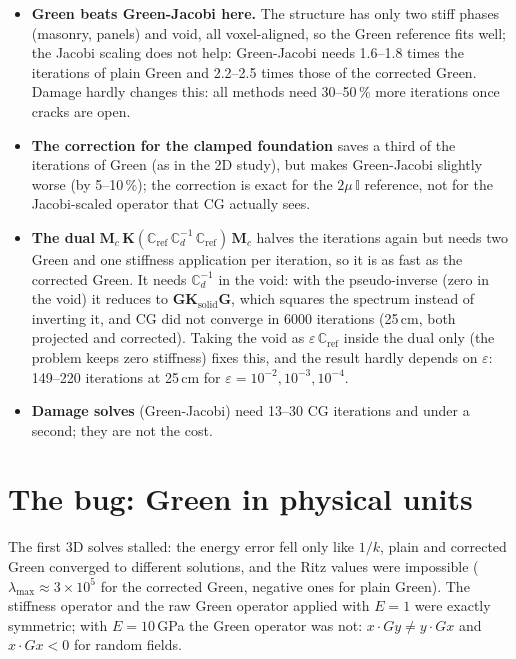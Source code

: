 \documentclass[11pt,a4paper]{article}
\begin{document}
\begin{itemize}
  \item \textbf{Green beats Green-Jacobi here.} The structure has only two stiff phases (masonry, panels) and void,
        all voxel-aligned, so the Green reference fits well; the Jacobi scaling does not help: Green-Jacobi needs 1.6--1.8 times the
        iterations of plain Green and 2.2--2.5 times those of the corrected Green. Damage hardly changes this: all methods need 30--50\,\% more iterations once cracks are open.
  \item \textbf{The correction for the clamped foundation} saves a third of the iterations of Green (as in the 2D
        study), but makes Green-Jacobi slightly worse (by 5--10\,\%); the correction is exact for the
        $2\mu\,\mathbb{I}$ reference, not for the Jacobi-scaled operator that CG actually sees.
  \item \textbf{The dual} $\mathbf{M}_c\,\mathbf{K}(\mathbb{C}_{\mathrm{ref}}\,\mathbb{C}_d^{-1}\,
        \mathbb{C}_{\mathrm{ref}})\,\mathbf{M}_c$ halves the iterations again but needs two Green and one stiffness
        application per iteration, so it is as fast as the corrected Green. It needs $\mathbb{C}_d^{-1}$ in the void:
        with the pseudo-inverse (zero in the void) it reduces to $\mathbf{G}\mathbf{K}_{\mathrm{solid}}\mathbf{G}$,
        which squares the spectrum instead of inverting it, and CG did not converge in 6000 iterations (25\,cm, both
        projected and corrected). Taking the void as $\varepsilon\,\mathbb{C}_{\mathrm{ref}}$ inside the dual only (the
        problem keeps zero stiffness) fixes this, and the result hardly depends on $\varepsilon$: 149--220 iterations at
        25\,cm for $\varepsilon = 10^{-2}, 10^{-3}, 10^{-4}$.
  \item \textbf{Damage solves} (Green-Jacobi) need 13--30 CG iterations and under a second; they are not the cost.
\end{itemize}

\section{The bug: Green in physical units}
\label{sec:bug}

The first 3D solves stalled: the energy error fell only like $1/k$, plain and corrected Green converged to different
solutions, and the Ritz values were impossible ($\lambda_{\max} \approx 3\times10^5$ for the corrected Green, negative
ones for plain Green). The stiffness operator and the raw Green operator applied with $E = 1$ were exactly symmetric;
with $E = 10$\,GPa the Green operator was not: $x \cdot Gy \ne y \cdot Gx$ and $x \cdot Gx < 0$ for random fields.
\end{document}
